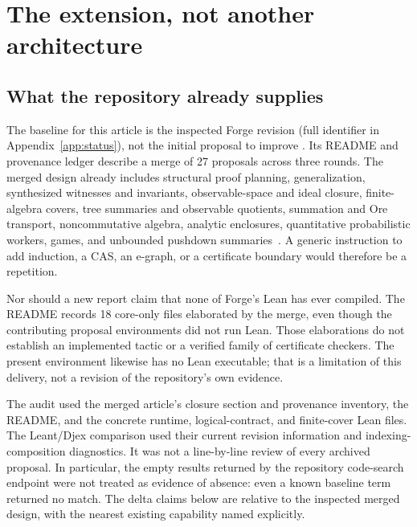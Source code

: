 \section{The extension, not another architecture}
\label{sec:delta}

\subsection{What the repository already supplies}
The baseline for this article is the inspected Forge revision
 (full identifier in Appendix~\ref{app:status}), not the
initial proposal to improve . Its README and provenance ledger describe a merge of
27 proposals across three rounds. The merged design already includes structural
proof planning, generalization, synthesized witnesses and invariants,
observable-space and ideal closure, finite-algebra covers, tree summaries and
observable quotients, summation and Ore transport, noncommutative algebra,
analytic enclosures, quantitative probabilistic workers, games, and unbounded
pushdown summaries~\cite{forge}. A generic instruction to add induction, a CAS,
an e-graph, or a certificate boundary would therefore be a repetition.

Nor should a new report claim that none of Forge's Lean has ever compiled. The
README records 18 core-only files elaborated by the merge, even though the
contributing proposal environments did not run Lean. Those elaborations do not
establish an implemented  tactic or a verified family of certificate
checkers. The present environment likewise has no Lean executable; that is a
limitation of this delivery, not a revision of the repository's own evidence.

The audit used the merged article's closure section and provenance inventory,
the README, and the concrete runtime, logical-contract, and finite-cover Lean
files. The Leant/Djex comparison used their current revision information and
indexing-composition diagnostics. It was not a line-by-line review of every
archived proposal. In particular, the empty results returned by the repository
code-search endpoint were not treated as evidence of absence: even a known
baseline term returned no match. The delta claims below are relative to the
inspected merged design, with the nearest existing capability named explicitly.

